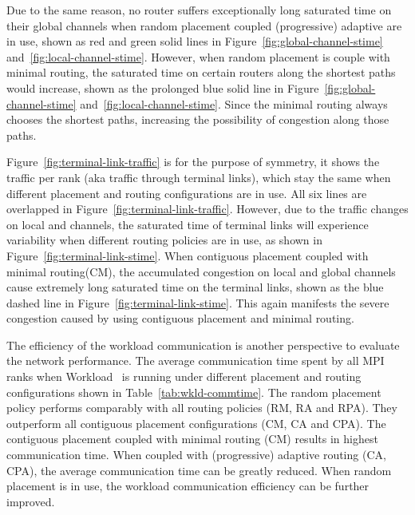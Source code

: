 Due to the same reason, 
no router suffers exceptionally long saturated time on their global channels when random placement coupled (progressive) adaptive are in use, 
shown as red and green solid lines in Figure~\ref{fig:global-channel-stime} and~\ref{fig:local-channel-stime}. 
However, when random placement is couple with minimal routing, 
the saturated time on certain routers along the shortest paths would increase, 
shown as the prolonged blue solid line in Figure~\ref{fig:global-channel-stime} and~\ref{fig:local-channel-stime}. 
Since the minimal routing always chooses the shortest paths, 
increasing the possibility of congestion along those paths. 


Figure~\ref{fig:terminal-link-traffic} is for the purpose of symmetry, 
it shows the traffic per rank (aka traffic through terminal links), 
which stay the same when different placement and routing configurations are in use. 
All six lines are overlapped in Figure~\ref{fig:terminal-link-traffic}. 
However, due to the traffic changes on local and channels, 
the saturated time of terminal links will experience variability when different routing policies are in use, as shown in Figure~\ref{fig:terminal-link-stime}. 
When contiguous placement coupled with minimal routing(CM), 
the accumulated congestion on local and global channels cause extremely long saturated time on the terminal links, 
shown as the blue dashed line in Figure~\ref{fig:terminal-link-stime}. 
This again manifests the severe congestion caused by using contiguous placement and minimal routing. 


The efficiency of the workload communication is another perspective to evaluate the network performance. 
The average communication time spent by all MPI ranks when Workload~ is running under different placement and routing configurations shown in Table~\ref{tab:wkld-commtime}. 
The random placement policy performs comparably with all routing policies (RM, RA and RPA). They outperform all contiguous placement configurations (CM, CA and CPA). The contiguous placement coupled with minimal routing (CM) results in highest communication time. When coupled with (progressive) adaptive routing (CA, CPA), the average communication time can be greatly reduced. When random placement is in use, the workload communication efficiency can be further improved. 


